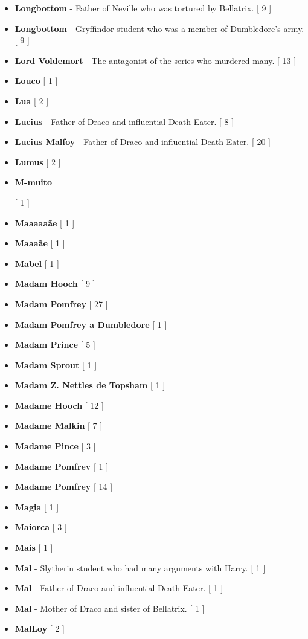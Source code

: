 \documentclass[a4paper]{article}
\begin{document}
{\begin{itemize}
	\item \textbf{Longbottom} - Father of Neville who was tortured by Bellatrix. [ 9 ]
	\item \textbf{Longbottom} - Gryffindor student who was a member of Dumbledore's army. [ 9 ]
	\item \textbf{Lord Voldemort} - The antagonist of the series who murdered many. [ 13 ]
	\item \textbf{Louco} [ 1 ]
	\item \textbf{Lua} [ 2 ]
	\item \textbf{Lucius} - Father of Draco and influential Death-Eater. [ 8 ]
	\item \textbf{Lucius Malfoy} - Father of Draco and influential Death-Eater. [ 20 ]
	\item \textbf{Lumus} [ 2 ]
	\item \hypertarget{M}{\textbf{M-muito}} [ 1 ]
	\item \textbf{Maaaaaãe} [ 1 ]
	\item \textbf{Maaaãe} [ 1 ]
	\item \textbf{Mabel} [ 1 ]
	\item \textbf{Madam Hooch} [ 9 ]
	\item \textbf{Madam Pomfrey} [ 27 ]
	\item \textbf{Madam Pomfrey a Dumbledore} [ 1 ]
	\item \textbf{Madam Prince} [ 5 ]
	\item \textbf{Madam Sprout} [ 1 ]
	\item \textbf{Madam Z. Nettles de Topsham} [ 1 ]
	\item \textbf{Madame Hooch} [ 12 ]
	\item \textbf{Madame Malkin} [ 7 ]
	\item \textbf{Madame Pince} [ 3 ]
	\item \textbf{Madame Pomfrev} [ 1 ]
	\item \textbf{Madame Pomfrey} [ 14 ]
	\item \textbf{Magia} [ 1 ]
	\item \textbf{Maiorca} [ 3 ]
	\item \textbf{Mais} [ 1 ]
	\item \textbf{Mal} - Slytherin student who had many arguments with Harry. [ 1 ]
	\item \textbf{Mal} - Father of Draco and influential Death-Eater. [ 1 ]
	\item \textbf{Mal} - Mother of Draco and sister of Bellatrix. [ 1 ]
	\item \textbf{MalLoy} [ 2 ]

\end{itemize}}
\end{document}
